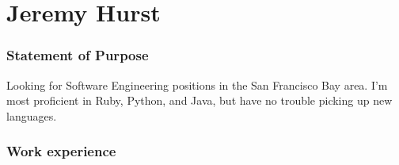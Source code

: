 \documentclass{tccv}
\begin{document}
\part{Jeremy Hurst}

\section{Statement of Purpose}

Looking for Software Engineering positions in the San Francisco Bay area. 
I'm most proficient in Ruby, Python, and Java, but have no trouble picking up new languages.

\section{Work experience}
\end{document}
